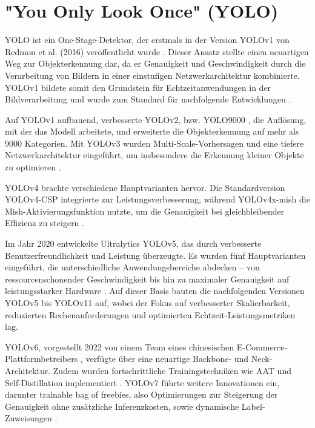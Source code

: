 \section{"You Only Look Once" (YOLO)}

\acrfull{YOLO} ist ein One-Stage-Detektor, der erstmals in der Version YOLOv1 von Redmon et al. (2016) veröffentlicht wurde \cite{redmon2016}. Dieser Ansatz stellte einen neuartigen Weg zur Objekterkennung dar, da er Genauigkeit und Geschwindigkeit durch die Verarbeitung von Bildern in einer einstufigen Netzwerkarchitektur kombinierte. YOLOv1 bildete somit den Grundstein für Echtzeitanwendungen in der Bildverarbeitung und wurde zum Standard für nachfolgende Entwicklungen \cite{Sapkota2025}.

Auf YOLOv1 aufbauend, verbesserte YOLOv2, bzw. YOLO9000 \cite{Li2018,Nakahara2018}, die Auflösung, mit der das Modell arbeitete, und erweiterte die Objekterkennung auf mehr als 9000 Kategorien. Mit YOLOv3 wurden Multi-Scale-Vorhersagen und eine tiefere Netzwerkarchitektur eingeführt, um insbesondere die Erkennung kleiner Objekte zu optimieren \cite{Kim2018}.

YOLOv4 brachte verschiedene Hauptvarianten hervor. Die Standardversion YOLOv4-CSP integrierte  zur Leistungsverbesserung, während YOLOv4x-mish die Mish-Aktivierungsfunktion nutzte, um die Genauigkeit bei gleichbleibender Effizienz zu steigern \cite{Nepal2022,Sozzi2022,Mohod2023}. 

Im Jahr 2020 entwickelte Ultralytics YOLOv5, das durch verbesserte Benutzerfreundlichkeit und Leistung überzeugte. Es wurden fünf Hauptvarianten eingeführt, die unterschiedliche Anwendungsbereiche abdecken – von ressourcenschonender Geschwindigkeit bis hin zu maximaler Genauigkeit auf leistungsstarker Hardware \cite{Sapkota2025,ultralyics_2020}. Auf dieser Basis bauten die nachfolgenden Versionen YOLOv5 bis YOLOv11 auf, wobei der Fokus auf verbesserter Skalierbarkeit, reduzierten Rechenanforderungen und optimierten Echtzeit-Leistungsmetriken lag.

YOLOv6, vorgestellt 2022 von einem Team eines chinesischen E-Commerce-Plattformbetreibers \cite{li2022}, verfügte über eine neuartige Backbone- und Neck-Architektur. Zudem wurden fortschrittliche Trainingstechniken wie \acrfull{AAT} und Self-Distillation implementiert \cite{Sapkota2025,li2022}. YOLOv7 \cite{wang2022,Wang2023} führte weitere Innovationen ein, darunter trainable bag of freebies, also Optimierungen zur Steigerung der Genauigkeit ohne zusätzliche Inferenzkosten, sowie dynamische Label-Zuweisungen \cite{wang2022,Wang2023,Sapkota2025}.

